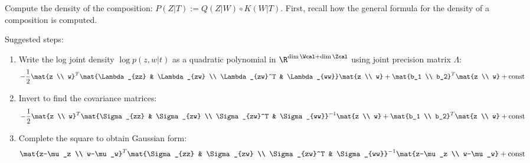 \begin{enumerate}
Compute the density of the composition: $P(Z|T):=Q(Z|W) \circ K(W|T)$. First, recall how the general formula for the density of a composition is computed.

Suggested steps:
\begin{enumerate}
  \item Write the log joint density $\log p(z, w|t)$ as a quadratic polynomial in $\R^{\dim \Wcal + \dim \Zcal}$ using joint precision matrix $\Lambda$:
  \[ 
    -\frac{1}{2} \mat{z \\ w}^T  \mat{\Lambda_{zz} & \Lambda_{zw} \\ \Lambda_{zw}^T & \Lambda_{ww}}\mat{z \\ w} + \mat{b_1 \\ b_2}^T\mat{z \\ w} + \text{const}
  \]
  \item Invert to find the covariance matrices:
  \[ 
    -\frac{1}{2} \mat{z \\ w}^T  \mat{\Sigma_{zz} & \Sigma_{zw} \\ \Sigma_{zw}^T & \Sigma_{ww}}^{-1}\mat{z \\ w} + \mat{b_1 \\ b_2}^T\mat{z \\ w} + \text{const}
  \]
  \item Complete the square to obtain Gaussian form:
  \[ 
    \mat{z-\mu_z \\ w-\mu_w}^T \mat{\Sigma_{zz} & \Sigma_{zw} \\ \Sigma_{zw}^T & \Sigma_{ww}}^{-1}\mat{z-\mu_z \\ w-\mu_w} + \text{const}
  \]


\end{enumerate}
\end{enumerate}
